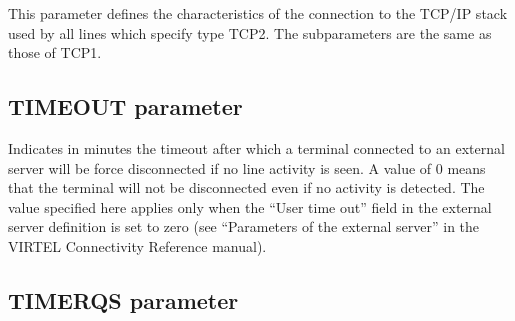\documentclass[letterpaper,10pt,english]{sphinxmanual}
\begin{document}
\sphinxAtStartPar
This parameter defines the characteristics of the connection to the TCP/IP stack used by all lines which specify type TCP2. The subparameters are the same as those of TCP1.

\ignorespaces 

\subsection{TIMEOUT parameter}
\label{\detokenize{Installation_Guide:timeout-parameter}}\label{\detokenize{Installation_Guide:index-124}}
\begin{sphinxVerbatim}[commandchars=\\\{\}]
 
\end{sphinxVerbatim}

\sphinxAtStartPar
{} \sphinxhyphen{} Indicates in minutes the time\sphinxhyphen{}out after which a terminal connected to an external server will be force disconnected if no line activity is seen. A value of 0 means that the terminal will not be disconnected even if no activity is detected. The value specified here applies only when the “User time out” field in the external server definition is set to zero (see “Parameters of the external server” in the VIRTEL Connectivity Reference manual).

\ignorespaces 

\subsection{TIMERQS parameter}
\label{\detokenize{Installation_Guide:timerqs-parameter}}\label{\detokenize{Installation_Guide:index-125}}
\begin{sphinxVerbatim}[commandchars=\\\{\}]
 
\end{sphinxVerbatim}
\end{document}
